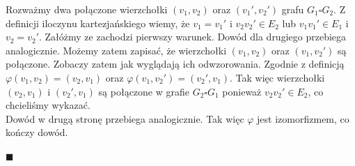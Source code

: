 \documentclass[12pt,a4paper,titlepage]{article}
\newcommand\tab[1][1cm]{\hspace*{#1}}
\begin{document}
\tab[0.6cm]Rozważmy dwa połączone wierzchołki $(v_1, v_2)$ oraz $(v_1', v_2')$ grafu $G_1 \square G_2$. Z definicji iloczynu kartezjańskiego wiemy, że $v_1 = v_1'$ i $v_2 v_2' \in E_2$ lub $v_1 v_1' \in E_1 $ i $v_2 = v_2 '$. Załóżmy ze zachodzi pierwszy warunek. Dowód dla drugiego przebiega analogicznie. Możemy zatem zapisać, że wierzchołki $(v_1, v_2)$ oraz $(v_1, v_2')$ są połączone. Zobaczy zatem jak wyglądają ich odwzorowania. Zgodnie z definicją $\varphi(v_1, v_2)=(v_2, v_1)$ oraz $\varphi(v_1, v_2')=(v_2', v_1)$. Tak więc wierzchołki $(v_2, v_1)$ i $(v_2', v_1)$ są połączone w grafie $G_2\square G_1$ ponieważ $v_2 v_2' \in E_2$, co chcieliśmy wykazać.\\
\tab[0.6cm]Dowód w drugą stronę przebiega analogicznie. Tak więc $\varphi$ jest izomorfizmem, co kończy dowód.
\begin{flushright}
$\blacksquare$
\end{flushright}
\end{document}
